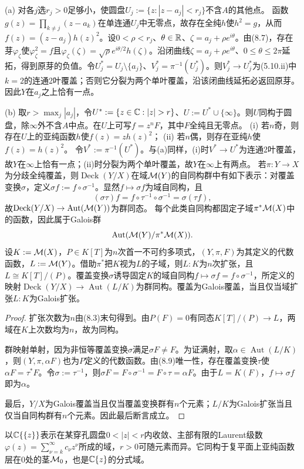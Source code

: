 (a) 对各$j$选$r_j>0$足够小，使圆盘$U_j:=\{z:|z-a_j|<r_j\}$不含$A$的其他点。
函数$g(z)=\prod_{k\ne j}(z-a_k)$在单连通$U_j$中无零点，故存在全纯$h$使$h^2=g$，从而$f(z)=(z-a_j)h(z)^2$。设$0<\rho<r_j$、$\theta\in\mathbb R$、$\zeta=a_j+\rho e^{i\theta}$。由(8.7)，存在芽$\varphi_\zeta$使$\varphi_\zeta^2=f$且$\varphi_\zeta(\zeta)=\sqrt\rho e^{i\theta/2}h(\zeta)$。沿闭曲线$\zeta=a_j+\rho e^{i\theta}$、$0\le\theta\le2\pi$延拓，得到原芽的负值。令$U_j^*=U_j\setminus\{a_j\}$、$V_j^*=\pi^{-1}(U_j^*)$。则$V_j^*\to U_j^*$为(5.10.ii)中$k=2$的连通2叶覆盖；否则它分裂为两个单叶覆盖，沿该闭曲线延拓必返回原芽。因此$Y$在$a_j$之上恰有一点。

(b) 取$r>\max_j|a_j|$，令$U^*:=\{z\in\C:|z|>r\}$、$U:=U^*\cup\{\infty\}$。则$U$同构于圆盘，除$\infty$外不含$A$中点。在$U$上可写$f=z^nF$，其中$F$全纯且无零点。
(i) 若$n$奇，则存在$U$上的亚纯函数$h$使$f(z)=zh(z)^2$；
(ii) 若$n$偶，则存在亚纯$h$使$f(z)=h(z)^2$。
令$V^*:=\pi^{-1}(U^*)$。与(a)同样，(i)时$V^*\to U^*$为连通2叶覆盖，故$Y$在$\infty$上恰有一点；(ii)时分裂为两个单叶覆盖，故$Y$在$\infty$上有两点。
若$\pi:Y\to X$为分歧全纯覆盖，则$\operatorname{Deck}(Y/X)$在域$\mathcal M(Y)$的自同构群中有如下表示：对覆盖变换$\sigma$，定义$\sigma f:=f\circ\sigma^{-1}$。显然$f\mapsto\sigma f$为域自同构，且
\[
(\sigma\tau)f=f\circ\tau^{-1}\circ\sigma^{-1}=\sigma(\tau f),
\]
故$\operatorname{Deck}(Y/X)\to\operatorname{Aut}(\mathcal M(Y))$为群同态。
每个此类自同构都固定子域$\pi^*\mathcal M(X)$中的函数，因此属于Galois群
\[\operatorname{Aut}(\mathcal M(Y)/\pi^*\mathcal M(X)).\]
设$K:=\mathcal M(X)$，$P\in K[T]$为$n$次首一不可约多项式，$(Y,\pi,F)$为其定义的代数函数，$L:=\mathcal M(Y)$。借助$\pi^*$把$K$视为$L$的子域，则$L:K$为$n$次扩张，且$L\cong K[T]/(P)$。覆盖变换$\sigma$诱导固定$K$的域自同构$f\mapsto\sigma f=f\circ\sigma^{-1}$，所定义的映射$\operatorname{Deck}(Y/X)\to\operatorname{Aut}(L/K)$为群同构。覆盖为Galois覆盖，当且仅当域扩张$L:K$为Galois扩张。
\begin{proof}
扩张次数为$n$由(8.3)末句得到。由$P(F)=0$有同态$K[T]/(P)\to L$，两域在$K$上次数均为$n$，故为同构。

群映射单射，因为非恒等覆盖变换$\sigma$满足$\sigma F\ne F$。为证满射，取$\alpha\in\operatorname{Aut}(L/K)$，则$(Y,\pi,\alpha F)$也为$P$定义的代数函数。由(8.9)唯一性，存在覆盖变换$\tau$使$\alpha F=\tau^*F$。令$\sigma:=\tau^{-1}$，则$\sigma F=F\circ\sigma^{-1}=F\circ\tau=\alpha F$。由于$L=K(F)$，$f\mapsto\sigma f$即为$\alpha$。

最后，$Y/X$为Galois覆盖当且仅当覆盖变换群有$n$个元素；$L/K$为Galois扩张当且仅当自同构群有$n$个元素。因此最后断言成立。
\end{proof}
以$\mathbb C\{\{z\}\}$表示在某穿孔圆盘$0<|z|<r$内收敛、主部有限的Laurent级数$\varphi(z)=\sum_{\nu=k}^\infty c_\nu z^\nu$所成的域，$r>0$可随元素而异。它同构于复平面上亚纯函数层在0处的茎$\mathcal M_0$，也是$\mathbb C\{z\}$的分式域。

